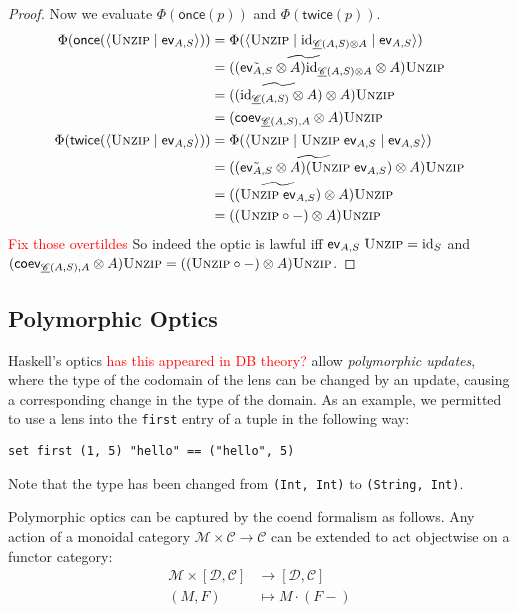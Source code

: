 \documentclass[11pt,a4paper]{article}
\theoremstyle{plain}
\theoremstyle{definition}
\newcommand{\C}{\mathscr{C}}
\newcommand{\homC}{\underline{\C}}
\newcommand{\D}{\mathscr{D}}
\newcommand{\M}{\mathscr{M}}
\newcommand{\id}{\mathrm{id}}
\newcommand{\rep}[2]{{\ensuremath \left\langle #1 \mid #2 \right\rangle}}
\newcommand{\repthree}[3]{{\ensuremath \langle #1 \mid #2 \mid #3 \rangle}}
\newcommand{\funzip}{\textsc{Unzip}}
\newcommand{\once}{\mathsf{once}}
\newcommand{\twice}{\mathsf{twice}}
\newcommand{\todo}[1]{\textcolor{red}{\small #1}}
\begin{document}
\begin{proof}
  Now we evaluate $\Phi(\once(p))$ and $\Phi(\twice(p))$.
  \begin{align*}
    \Phi(\once(\rep{\funzip }{\ev_{A, S} }))
    &= \Phi(\repthree{\funzip }{\id_{\homC(A,S) \otimes A}}{\ev_{A, S} }) \\
    &= (\widetilde{(\tilde{\ev_{A, S}} \otimes A)\id_{\homC(A,S) \otimes A}} \otimes A)\funzip \\
    &= (\widetilde{(\id_{\homC(A, S)} \otimes A)} \otimes A)\funzip \\
    &= (\coev_{\homC(A, S), A} \otimes A)\funzip \\
    \Phi(\twice(\rep{\funzip }{\ev_{A, S} }))
    &= \Phi(\repthree{\funzip }{\funzip \; \ev_{A, S}}{\ev_{A, S} }) \\
    &= (\widetilde{(\tilde{\ev_{A, S}} \otimes A)(\funzip \; \ev_{A, S})} \otimes A)\funzip \\
    &= (\widetilde{(\funzip \; \ev_{A, S})} \otimes A)\funzip \\
    &= ((\funzip \circ -) \otimes A)\funzip
  \end{align*}
  \todo{Fix those overtildes}
  So indeed the optic is lawful iff $\ev_{A, S} \; \funzip = \id_S$ and $(\coev_{\homC(A, S), A} \otimes A)\funzip = ((\funzip \circ -) \otimes A)\funzip$.
\end{proof}

\subsection{Polymorphic Optics}
Haskell's optics \todo{has this appeared in DB theory?} allow \emph{polymorphic updates}, where the type of the codomain of the lens can be changed by an update, causing a corresponding change in the type of the domain. As an example, we permitted to use a lens into the \texttt{first} entry of a tuple in the following way:
\begin{verbatim}
set first (1, 5) "hello" == ("hello", 5)
\end{verbatim}
Note that the type has been changed from \texttt{(Int, Int)} to \texttt{(String, Int)}.

Polymorphic optics can be captured by the coend formalism as follows. Any action of a monoidal category $\M \times \C \to \C$ can be extended to act objectwise on a functor category:
\begin{align*}
  \M \times [\D, \C] &\to [\D, \C] \\
  (M, F) &\mapsto  M \cdot (F-)
\end{align*}
\end{document}
